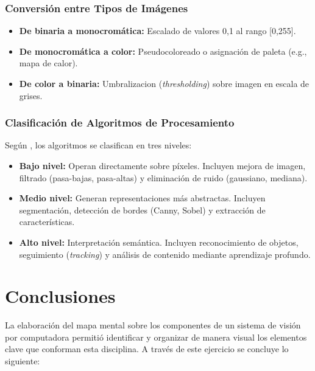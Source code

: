 \documentclass[12pt,letterpaper]{article}
\begin{document}
\subsubsection{Conversión entre Tipos de Imágenes}

\begin{itemize}[leftmargin=1.5cm]
    \item \textbf{De binaria a monocromática:} Escalado de valores {0,1} al rango [0,255].
    \item \textbf{De monocromática a color:} Pseudocoloreado o asignación de paleta (e.g., mapa de calor).
    \item \textbf{De color a binaria:} Umbralizacion (\textit{thresholding}) sobre imagen en escala de grises.
\end{itemize}

\subsubsection{Clasificación de Algoritmos de Procesamiento}

Según \citet{gonzalez2018digital}, los algoritmos se clasifican en tres niveles:

\begin{itemize}[leftmargin=1.5cm]
    \item \textbf{Bajo nivel:} Operan directamente sobre píxeles. Incluyen mejora de imagen, filtrado (pasa-bajas, pasa-altas) y eliminación de ruido (gaussiano, mediana).
    \item \textbf{Medio nivel:} Generan representaciones más abstractas. Incluyen segmentación, detección de bordes (Canny, Sobel) y extracción de características.
    \item \textbf{Alto nivel:} Interpretación semántica. Incluyen reconocimiento de objetos, seguimiento (\textit{tracking}) y análisis de contenido mediante aprendizaje profundo.
\end{itemize}

\newpage
\section{Conclusiones}

La elaboración del mapa mental sobre los componentes de un sistema de visión
por computadora permitió identificar y organizar de manera visual los elementos
clave que conforman esta disciplina. A través de este ejercicio se concluye lo
siguiente:
\end{document}
